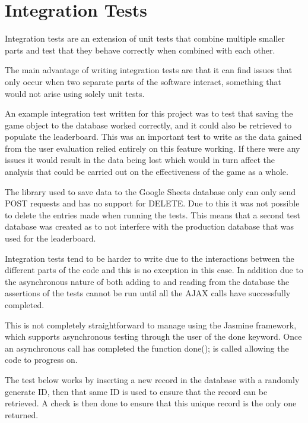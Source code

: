\documentclass[12pt,a4paper]{report}
\begin{document}
\section{Integration Tests}
Integration tests are an extension of unit tests that combine multiple smaller parts and test that they behave correctly when combined with each other. 

The main advantage of writing integration tests are that it can find issues that only occur when two separate parts of the software interact, something that would not arise using solely unit tests. 

An example integration test written for this project was to test that saving the game object to the database worked correctly, and it could also be retrieved to populate the leaderboard. This was an important test to write as the data gained from the user evaluation relied entirely on this feature working. If there were any issues it would result in the data being lost which would in turn affect the analysis that could be carried out on the effectiveness of the game as a whole. 

The library used to save data to the Google Sheets database only can only send POST requests and has no support for DELETE. Due to this it was not possible to delete the entries made when running the tests. This means that a second test database was created as to not interfere with the production database that was used for the leaderboard. 

Integration tests tend to be harder to write due to the interactions between the different parts of the code and this is no exception in this case. In addition due to the asynchronous nature of both adding to and reading from the database the assertions of the tests cannot be run until all the AJAX calls have successfully completed. 

This is not completely straightforward to manage using the Jasmine framework, which supports asynchronous testing through the user of the done keyword. Once an asynchronous call has completed the function done(); is called allowing the code to progress on. 

The test below works by inserting a new record in the database with a randomly generate ID, then that same ID is used to ensure that the record can be retrieved. A check is then done to ensure that this unique record is the only one returned. 
\end{document}
